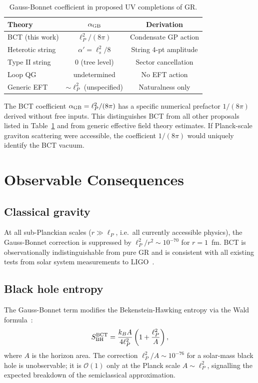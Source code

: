 \documentclass[twocolumn,10pt,a4paper]{article}
\begin{document}
\begin{table}[h!]
\caption{Gauss-Bonnet coefficient in proposed UV completions of GR.}
\label{tab:GB_compare}
\renewcommand{\arraystretch}{1.20}
\setlength{\tabcolsep}{4pt}
\begin{tabular}{@{}p{2.2cm}cc@{}}
\toprule
Theory & $\alpha_{\rm GB}$ & Derivation \\
\midrule
BCT (this work) & $\ell_P^2/(8\pi)$ & Condensate GP action \\
Heterotic string & $\alpha' = \ell_s^2/8$ & String 4-pt amplitude \\
Type II string   & 0 (tree level) & Sector cancellation \\
Loop QG          & undetermined & No EFT action \\
Generic EFT      & $\sim\ell_P^2$ (unspecified) & Naturalness only \\
\bottomrule
\end{tabular}
\end{table}

The BCT coefficient $\alpha_{\rm GB} = \ell_P^2/(8\pi)$ has a specific
numerical prefactor $1/(8\pi)$ derived without free inputs. This
distinguishes BCT from all other proposals listed in
Table~\ref{tab:GB_compare} and from generic effective field theory
estimates. If Planck-scale graviton scattering were accessible, the
coefficient $1/(8\pi)$ would uniquely identify the BCT vacuum.

\section*{Observable Consequences}

\subsection*{Classical gravity}
At all sub-Planckian scales ($r \gg \ell_P$, i.e.\ all currently
accessible physics), the Gauss-Bonnet correction is suppressed by
$\ell_P^2/r^2 \sim 10^{-70}$ for $r = 1$~fm. BCT is observationally
indistinguishable from pure GR and is consistent with all existing
tests from solar system measurements to LIGO~\cite{ligo16}.

\subsection*{Black hole entropy}
The Gauss-Bonnet term modifies the Bekenstein-Hawking entropy via
the Wald formula~\cite{wald93}:
\begin{equation}
  S_{\rm BH}^{\rm BCT} = \frac{k_B A}{4\ell_P^2}
  \left(1 + \frac{\ell_P^2}{A}\right),
  \label{eq:SBH_BCT}
\end{equation}
where $A$ is the horizon area. The correction $\ell_P^2/A \sim 10^{-76}$
for a solar-mass black hole is unobservable; it is $\mathcal{O}(1)$ only
at the Planck scale $A \sim \ell_P^2$, signalling the expected
breakdown of the semiclassical approximation.
\end{document}
